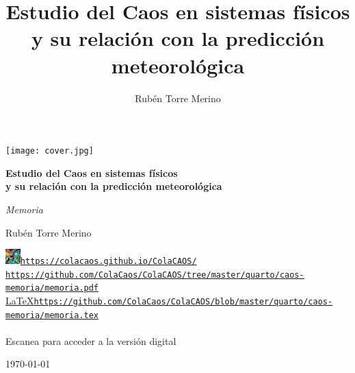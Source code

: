 \documentclass[
  10pt,
  a4paper,
  DIV=11,
  numbers=noendperiod,
  open=any]{scrreprt}
\title{Estudio del Caos en sistemas físicos y su relación con la
predicción meteorológica}
\author{Rubén Torre Merino}
\date{}
\numberwithin{equation}{chapter}
\numberwithin{equation}{section}
\renewcommand{\[}{\begin{equation}}
\renewcommand{\]}{\end{equation}}
\begin{document}
\begin{titlepage}
  \centering
  \vspace*{2cm}
  \texttt{[image: cover.jpg]}\par
  \vspace{1.2cm}

  {\Huge\bfseries\color{Main} Estudio del Caos en sistemas físicos\\[2mm]
  y su relación con la predicción meteorológica\par}

  \vspace{0.8cm}
  {\Large\color{gray!90} \textit{Memoria}}\par

  \vspace{1.2cm}
  {\Large Rubén Torre Merino}\par

  \vfill
  \begingroup
  \centering
  \small
  \setlength{\baselineskip}{1.1em}

  \href{https://colacaos.github.io/ColaCAOS/}{\includegraphics[height=1.56em]{favicon.png}\hspace{0.3em}\texttt{https://colacaos.github.io/ColaCAOS/}}\\[0.25cm]

  \href{https://github.com/ColaCaos/ColaCAOS/tree/master/quarto/caos-memoria/memoria.pdf}{{\textcolor{red}{\raisebox{-0.1ex}{\scalebox{1.3}{\faFilePdf}}}}\hspace{0.35em}\texttt{https://github.com/ColaCaos/ColaCAOS/tree/master/quarto/caos-memoria/memoria.pdf}}\\[0.25cm]

  \href{https://github.com/ColaCaos/ColaCAOS/blob/master/quarto/caos-memoria/memoria.tex}{{\LaTeX}\hspace{0.35em}\texttt{https://github.com/ColaCaos/ColaCAOS/blob/master/quarto/caos-memoria/memoria.tex}}\\[0.6cm]

  \\[0.2cm]
  {\footnotesize Escanea para acceder a la versión digital}
  \par
  \endgroup

  \vspace{1.0cm}
  {\large \today}\par
\end{titlepage}
\end{document}
